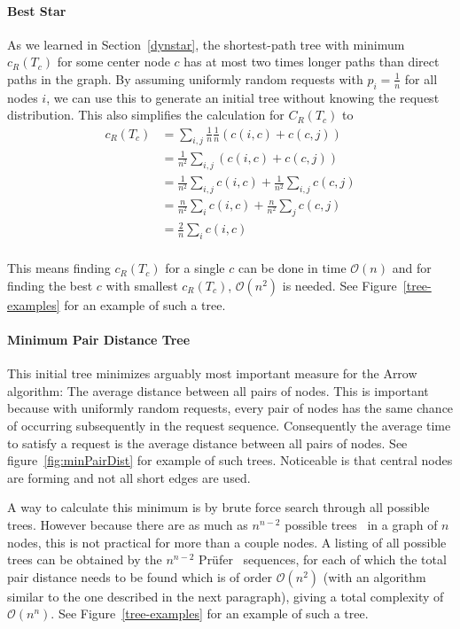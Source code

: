 \documentclass[a4paper, oneside]{discothesis}
\begin{document}
\paragraph{Best Star}

As we learned in Section~\ref{dynstar}, the shortest-path tree with minimum $c_R(T_c)$ for some center node $c$ has at most two times longer paths than direct paths in the graph. By assuming uniformly random requests with $p_i=\frac{1}{n}$ for all nodes $i$, we can use this to generate an initial tree without knowing the request distribution. This also simplifies the calculation for $C_R(T_c)$ to
\begin{equation}
\begin{split}
c_R(T_c)&=\sum_{i,j}\frac{1}{n}\frac{1}{n}(c(i,c)+c(c,j)) \\
&=\frac{1}{n^2}\sum_{i,j}(c(i,c)+c(c,j)) \\
&=\frac{1}{n^2}\sum_{i,j}c(i,c)+\frac{1}{n^2}\sum_{i,j}c(c,j) \\
&=\frac{n}{n^2}\sum_{i}c(i,c)+\frac{n}{n^2}\sum_{j}c(c,j) \\
&=\frac{2}{n}\sum_{i}c(i,c) \\
\end{split}
\end{equation}

This means finding $c_R(T_c)$ for a single $c$ can be done in time $\mathcal{O}(n)$ and for finding the best $c$ with smallest $c_R(T_c)$, $\mathcal{O}(n^2)$ is needed. See Figure~\ref{tree-examples} for an example of such a tree.

\paragraph{Minimum Pair Distance Tree}
\label{tree:mpd}

This initial tree minimizes arguably most important measure for the Arrow algorithm: The average distance between all pairs of nodes. This is important because with uniformly random requests, every pair of nodes has the same chance of occurring subsequently in the request sequence. Consequently the average time to satisfy a request is the average distance between all pairs of nodes. See figure~\ref{fig:minPairDist} for example of such trees. Noticeable is that central nodes are forming and not all short edges are used.

A way to calculate this minimum is by brute force search through all possible trees. However because there are as much as $n^{n-2}$ possible trees~\cite{Borchardt} in a graph of $n$ nodes, this is not practical for more than a couple nodes. A listing of all possible trees can be obtained by the $n^{n-2}$ Prüfer~\cite{Prufer} sequences, for each of which the total pair distance needs to be found which is of order $\mathcal{O}(n^2)$ (with an algorithm similar to the one described in the next paragraph), giving a total complexity of $\mathcal{O}(n^n)$. See Figure~\ref{tree-examples} for an example of such a tree.
\end{document}
